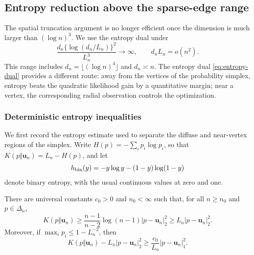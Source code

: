 \subsection{Entropy reduction above the sparse-edge range}
\label{sec:explicit-regime}

The spatial truncation argument is no longer efficient once the dimension is
much larger than \((\log n)^3\). We use the entropy dual under
\begin{equation}
\label{eq:entropy-regime}
  \frac{d_n\{\log(d_n/L_n)\}^2}{L_n^3}\longrightarrow\infty,
  \qquad
  d_nL_n=o(n^2).
\end{equation}
This range includes
\(d_n=\lfloor(\log n)^4\rfloor\) and \(d_n\asymp n\). The entropy dual
\eqref{eq:entropy-dual}
provides a different route: away from the vertices of the probability
simplex, entropy beats the quadratic likelihood gain by a quantitative
margin; near a vertex, the corresponding radial observation controls the
optimization.

\subsubsection{Deterministic entropy inequalities}

We first record the entropy estimate used to separate the diffuse and
near-vertex regions of the simplex. Write \(H(p)=-\sum_i p_i\log p_i\), so that
\(K(p\Vert \mathbf u_n)=L_n-H(p)\), and let
\[
  h_{\rm bin}(y)=-y\log y-(1-y)\log(1-y)
\]
denote binary entropy, with the usual continuous values at zero and one.

\begin{lemma}
\label{lem:simplex-entropy}
There are universal constants \(c_0>0\) and \(n_0<\infty\) such that, for
all \(n\ge n_0\) and \(p\in\Delta_n\),
\begin{equation}
\label{eq:entropy-collision}
  K(p\Vert \mathbf u_n)
  \ge
  \frac{n-1}{n-2}\log(n-1)|p-\mathbf u_n|_2^2
  \ge
  L_n|p-\mathbf u_n|_2^2.
\end{equation}
Moreover, if
\(\max_i p_i\le1-L_n^{-2}\), then
\begin{equation}
\label{eq:entropy-stability}
  K(p\Vert \mathbf u_n)-L_n|p-\mathbf u_n|_2^2
  \ge
  \frac{c_0}{L_n}|p-\mathbf u_n|_1^2.
\end{equation}
\end{lemma}

